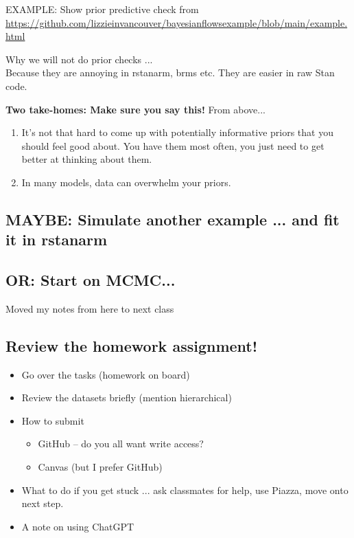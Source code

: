 \documentclass[11pt]{article}
\begin{document}
EXAMPLE: Show prior predictive check from \url{https://github.com/lizzieinvancouver/bayesianflowsexample/blob/main/example.html} 

Why we will not do prior checks ... \\ Because they are annoying in rstanarm, brms etc. They are easier in raw Stan code. 

{\bf Two take-homes: Make sure you say this!} From above...
\begin{enumerate}
\item It's not that hard to come up with potentially informative priors that you should feel good about. You have them most often, you just need to get better at thinking about them.
\item In many models, data can overwhelm your priors. 
\end{enumerate}


\subsection{MAYBE: Simulate another example ... and fit it in rstanarm} 
\subsection{OR: Start on MCMC...} Moved my notes from here to next class 



\subsection{Review the homework assignment!}
\begin{itemize}
\item Go over the tasks (homework on board)
\item Review the datasets briefly (mention hierarchical)
\item How to submit
\begin{itemize}
\item GitHub -- do you all want write access?
\item Canvas (but I prefer GitHub)
\end{itemize}
\item What to do if you get stuck ... ask classmates for help, use Piazza, move onto next step. 
\item A note on using ChatGPT
\end{itemize}
\end{document}
